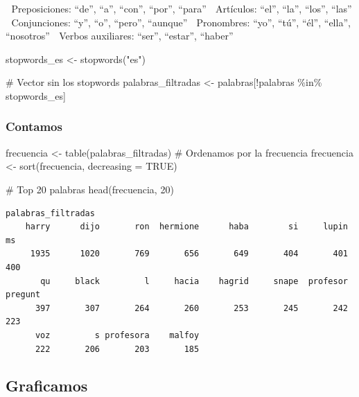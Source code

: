 \documentclass[
  letterpaper,
  DIV=11,
  numbers=noendperiod]{scrreprt}
\newenvironment{Shaded}{\begin{snugshade}}{\end{snugshade}}
\newcommand{\AttributeTok}[1]{\textcolor[rgb]{0.40,0.45,0.13}{#1}}
\newcommand{\CommentTok}[1]{\textcolor[rgb]{0.37,0.37,0.37}{#1}}
\newcommand{\ConstantTok}[1]{\textcolor[rgb]{0.56,0.35,0.01}{#1}}
\newcommand{\DecValTok}[1]{\textcolor[rgb]{0.68,0.00,0.00}{#1}}
\newcommand{\FunctionTok}[1]{\textcolor[rgb]{0.28,0.35,0.67}{#1}}
\newcommand{\NormalTok}[1]{\textcolor[rgb]{0.00,0.23,0.31}{#1}}
\newcommand{\OtherTok}[1]{\textcolor[rgb]{0.00,0.23,0.31}{#1}}
\newcommand{\SpecialCharTok}[1]{\textcolor[rgb]{0.37,0.37,0.37}{#1}}
\newcommand{\StringTok}[1]{\textcolor[rgb]{0.13,0.47,0.30}{#1}}
\begin{document}
🔹 Preposiciones: ``de'', ``a'', ``con'', ``por'', ``para'' 🔹
Artículos: ``el'', ``la'', ``los'', ``las'' 🔹 Conjunciones: ``y'',
``o'', ``pero'', ``aunque'' 🔹 Pronombres: ``yo'', ``tú'', ``él'',
``ella'', ``nosotros'' 🔹 Verbos auxiliares: ``ser'', ``estar'',
``haber''

\begin{Shaded}
\begin{Highlighting}[]
\NormalTok{stopwords\_es }\OtherTok{\textless{}{-}} \FunctionTok{stopwords}\NormalTok{(}\StringTok{"es"}\NormalTok{) }

\CommentTok{\# Vector sin los stopwords}
\NormalTok{palabras\_filtradas }\OtherTok{\textless{}{-}}\NormalTok{ palabras[}\SpecialCharTok{!}\NormalTok{palabras }\SpecialCharTok{\%in\%}\NormalTok{ stopwords\_es] }
\end{Highlighting}
\end{Shaded}

\subsubsection{Contamos}\label{contamos}

\begin{Shaded}
\begin{Highlighting}[]
\NormalTok{frecuencia }\OtherTok{\textless{}{-}} \FunctionTok{table}\NormalTok{(palabras\_filtradas)}
\CommentTok{\# Ordenamos por la frecuencia}
\NormalTok{frecuencia }\OtherTok{\textless{}{-}} \FunctionTok{sort}\NormalTok{(frecuencia, }\AttributeTok{decreasing =} \ConstantTok{TRUE}\NormalTok{) }

\CommentTok{\# Top 20 palabras}
\FunctionTok{head}\NormalTok{(frecuencia, }\DecValTok{20}\NormalTok{)}
\end{Highlighting}
\end{Shaded}

\begin{verbatim}
palabras_filtradas
    harry      dijo       ron  hermione      haba        si     lupin        ms 
     1935      1020       769       656       649       404       401       400 
       qu     black         l     hacia    hagrid     snape  profesor   pregunt 
      397       307       264       260       253       245       242       223 
      voz         s profesora    malfoy 
      222       206       203       185 
\end{verbatim}

\subsection{Graficamos}\label{graficamos}
\end{document}
